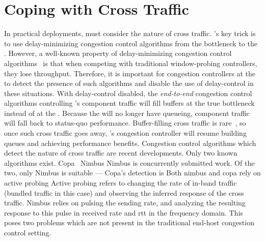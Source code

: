 \section{Coping with Cross Traffic}\label{s:queue-ctl}

\begin{outline}
\1 In practical deployments, \name must consider the nature of cross traffic.
\1 \name's key trick is to use delay-minimizing congestion control algorithms from the bottleneck to the \inbox.
\1 However, a well-known property of delay-minimizing congestion control algorithms~\cite{pantheon} is that when competing with traditional window-probing controllers, they lose throughput.
\1 Therefore, it is important for congestion controllers at the \inbox to detect the presence of such algorithms and disable the use of delay-control in these situations.
    \2 With delay-control disabled, the \emph{end-to-end} congestion control algorithms controlling \name's component traffic will fill buffers at the true bottleneck instead of at the \inbox.
    \2 Because the \inbox will no longer have queueing, component traffic will fall back to status-quo performance.
    \2 Buffer-filling cross traffic is rare~\cite{something}, so once such cross traffic goes away, \name's congestion controller will resume building queues and achieving performance benefits.
\1 Congestion control algorithms which detect the nature of cross traffic are recent developments. Only two known algorithms exist.
    \2 Copa~\cite{copa}
    \2 Nimbus
        \3 Nimbus is concurrently submitted work.
    \2 Of the two, only Nimbus is suitable --- Copa's detection is  
\1 Both nimbus and copa rely on active probing
    \2 Active probing refers to changing the rate of in-band traffic (bundled traffic in this case) and observing the inferred response of the cross traffic.
\1 Nimbus relies on pulsing the sending rate, and analyzing the resulting response to this pulse in received rate and rtt in the frequency domain. 
    \2 This poses two problems which are not present in the traditional end-host congestion control setting. 

\end{outline}
